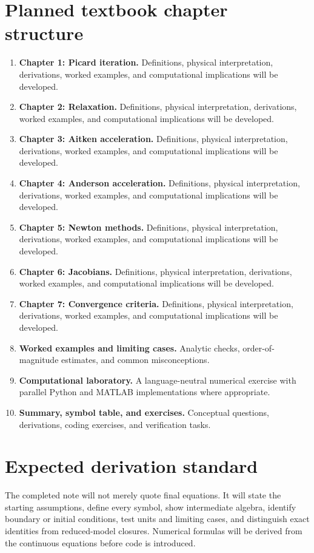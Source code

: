 \documentclass[11pt]{article}
\begin{document}
\section{Planned textbook chapter structure}
\begin{enumerate}[leftmargin=1.8em]
\item \textbf{Chapter 1: Picard iteration.} Definitions, physical interpretation, derivations, worked examples, and computational implications will be developed.
\item \textbf{Chapter 2: Relaxation.} Definitions, physical interpretation, derivations, worked examples, and computational implications will be developed.
\item \textbf{Chapter 3: Aitken acceleration.} Definitions, physical interpretation, derivations, worked examples, and computational implications will be developed.
\item \textbf{Chapter 4: Anderson acceleration.} Definitions, physical interpretation, derivations, worked examples, and computational implications will be developed.
\item \textbf{Chapter 5: Newton methods.} Definitions, physical interpretation, derivations, worked examples, and computational implications will be developed.
\item \textbf{Chapter 6: Jacobians.} Definitions, physical interpretation, derivations, worked examples, and computational implications will be developed.
\item \textbf{Chapter 7: Convergence criteria.} Definitions, physical interpretation, derivations, worked examples, and computational implications will be developed.
\item \textbf{Worked examples and limiting cases.} Analytic checks, order-of-magnitude estimates, and common misconceptions.
\item \textbf{Computational laboratory.} A language-neutral numerical exercise with parallel Python and MATLAB implementations where appropriate.
\item \textbf{Summary, symbol table, and exercises.} Conceptual questions, derivations, coding exercises, and verification tasks.
\end{enumerate}

\section{Expected derivation standard}
The completed note will not merely quote final equations. It will state the starting assumptions, define every symbol, show intermediate algebra, identify boundary or initial conditions, test units and limiting cases, and distinguish exact identities from reduced-model closures. Numerical formulas will be derived from the continuous equations before code is introduced.
\end{document}
